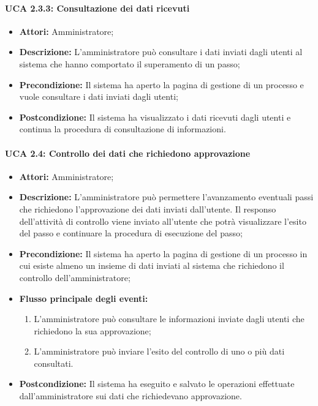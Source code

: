 \paragraph{UCA 2.3.3: Consultazione dei dati ricevuti}
\begin{itemize}
\item \textbf{Attori:} Amministratore;
\item \textbf{Descrizione:} 
L'amministratore può consultare i dati inviati dagli utenti al sistema che hanno comportato il superamento di un passo;
\item \textbf{Precondizione:} 
Il sistema ha aperto la pagina di gestione di un processo e vuole consultare i dati inviati dagli utenti;
\item \textbf{Postcondizione:} 
Il sistema ha visualizzato i dati ricevuti dagli utenti e continua la procedura di consultazione di informazioni.
\end{itemize}

\paragraph{UCA 2.4: Controllo dei dati che richiedono approvazione}
\begin{itemize}
\item \textbf{Attori:}
 Amministratore;
\item \textbf{Descrizione:} 
L'amministratore può permettere l'avanzamento eventuali passi che richiedono l'approvazione dei dati inviati dall'utente.
Il responso dell'attività di controllo viene inviato all'utente che potrà visualizzare l'esito del passo e continuare la procedura di esecuzione del passo;
\item \textbf{Precondizione:} 
Il sistema ha aperto la pagina di gestione di un processo in cui esiste almeno un insieme di dati inviati al sistema che richiedono il controllo dell'amministratore;
\item \textbf{Flusso principale degli eventi:} 
\begin{enumerate}
\item L'amministratore può consultare le informazioni inviate dagli utenti che richiedono la sua approvazione;
\item L'amministratore può inviare l'esito del controllo di uno o più dati consultati.
\end{enumerate}
\item \textbf{Postcondizione:} 
Il sistema ha eseguito e salvato le operazioni effettuate dall'amministratore sui dati che richiedevano approvazione.
\end{itemize}

